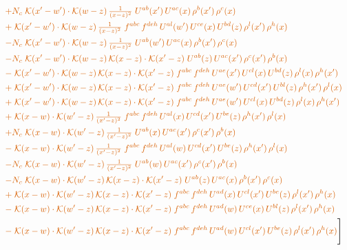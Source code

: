 \documentclass[10pt]{article}
\numberwithin{equation}{section}
\begin{document}
\begin{align}
&\quad{\color{BFK}+N_c\;\mathcal{K}(x'-w')\cdot\mathcal{K}(w-z)\,\tfrac{1}{(x-z)^{2}}\;U^{ab}(x')\,U^{ac}(x)\,\rho^{b}(x')\,\rho^{c}(x)}\notag\\
&\quad{\color{BFK}+\;\mathcal{K}(x'-w')\cdot\mathcal{K}(w-z)\,\tfrac{1}{(x-z)^{2}}\;f^{abc}\,f^{deh}\,U^{al}(w')\,U^{ce}(x)\,U^{bd}(z)\,\rho^{l}(x')\,\rho^{h}(x)}\notag\\
&\quad{\color{BFK}-N_c\;\mathcal{K}(x'-w')\cdot\mathcal{K}(w-z)\,\tfrac{1}{(x-z)^{2}}\;U^{ab}(w')\,U^{ac}(x)\,\rho^{b}(x')\,\rho^{c}(x)}\notag\\
&\quad{\color{BFK}-N_c\;\mathcal{K}(x'-w')\cdot\mathcal{K}(w-z)\,\mathcal{K}(x-z)\cdot\mathcal{K}(x'-z)\;U^{ab}(z)\,U^{ac}(x')\,\rho^{c}(x')\,\rho^{b}(x)}\notag\\
&\quad{\color{BFK}-\;\mathcal{K}(x'-w')\cdot\mathcal{K}(w-z)\,\mathcal{K}(x-z)\cdot\mathcal{K}(x'-z)\;f^{abc}\,f^{deh}\,U^{ae}(x')\,U^{cl}(x)\,U^{bd}(z)\,\rho^{l}(x)\,\rho^{h}(x')}\notag\\
&\quad{\color{BFK}+\;\mathcal{K}(x'-w')\cdot\mathcal{K}(w-z)\,\mathcal{K}(x-z)\cdot\mathcal{K}(x'-z)\;f^{abc}\,f^{deh}\,U^{ae}(w')\,U^{cd}(x')\,U^{bl}(z)\,\rho^{h}(x')\,\rho^{l}(x)}\notag\\
&\quad{\color{BFK}+\;\mathcal{K}(x'-w')\cdot\mathcal{K}(w-z)\,\mathcal{K}(x-z)\cdot\mathcal{K}(x'-z)\;f^{abc}\,f^{deh}\,U^{ae}(w')\,U^{cl}(x)\,U^{bd}(z)\,\rho^{l}(x)\,\rho^{h}(x')}\notag\\
&\quad{\color{BFK}+\;\mathcal{K}(x-w)\cdot\mathcal{K}(w'-z)\,\tfrac{1}{(x'-z)^{2}}\;f^{abc}\,f^{deh}\,U^{al}(x)\,U^{cd}(x')\,U^{be}(z)\,\rho^{h}(x')\,\rho^{l}(x)}\notag\\
&\quad{\color{BFK}+N_c\;\mathcal{K}(x-w)\cdot\mathcal{K}(w'-z)\,\tfrac{1}{(x'-z)^{2}}\;U^{ab}(x)\,U^{ac}(x')\,\rho^{c}(x')\,\rho^{b}(x)}\notag\\
&\quad{\color{BFK}-\;\mathcal{K}(x-w)\cdot\mathcal{K}(w'-z)\,\tfrac{1}{(x'-z)^{2}}\;f^{abc}\,f^{deh}\,U^{al}(w)\,U^{cd}(x')\,U^{be}(z)\,\rho^{h}(x')\,\rho^{l}(x)}\notag\\
&\quad{\color{BFK}-N_c\;\mathcal{K}(x-w)\cdot\mathcal{K}(w'-z)\,\tfrac{1}{(x'-z)^{2}}\;U^{ab}(w)\,U^{ac}(x')\,\rho^{c}(x')\,\rho^{b}(x)}\notag\\
&\quad{\color{BFK}-N_c\;\mathcal{K}(x-w)\cdot\mathcal{K}(w'-z)\,\mathcal{K}(x-z)\cdot\mathcal{K}(x'-z)\;U^{ab}(z)\,U^{ac}(x)\,\rho^{b}(x')\,\rho^{c}(x)}\notag\\
&\quad{\color{BFK}+\;\mathcal{K}(x-w)\cdot\mathcal{K}(w'-z)\,\mathcal{K}(x-z)\cdot\mathcal{K}(x'-z)\;f^{abc}\,f^{deh}\,U^{ad}(x)\,U^{cl}(x')\,U^{be}(z)\,\rho^{l}(x')\,\rho^{h}(x)}\notag\\
&\quad{\color{BFK}-\;\mathcal{K}(x-w)\cdot\mathcal{K}(w'-z)\,\mathcal{K}(x-z)\cdot\mathcal{K}(x'-z)\;f^{abc}\,f^{deh}\,U^{ad}(w)\,U^{ce}(x)\,U^{bl}(z)\,\rho^{l}(x')\,\rho^{h}(x)}\notag\\
&\quad{\color{BFK}-\;\mathcal{K}(x-w)\cdot\mathcal{K}(w'-z)\,\mathcal{K}(x-z)\cdot\mathcal{K}(x'-z)\;f^{abc}\,f^{deh}\,U^{ad}(w)\,U^{cl}(x')\,U^{be}(z)\,\rho^{l}(x')\,\rho^{h}(x)}\Bigg]\label{eq:P1}
\end{align}
\end{document}
